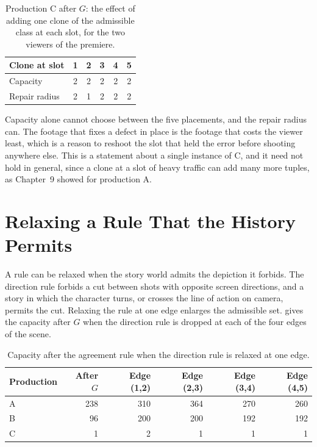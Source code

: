 \documentclass[11pt,twoside,openright]{book}
\theoremstyle{plain}
\theoremstyle{definition}
\theoremstyle{remark}
\begin{document}
\begin{table}[ht]
\centering
\begin{tabular}{@{}lccccc@{}}
\toprule
Clone at slot & 1 & 2 & 3 & 4 & 5\\
\midrule
Capacity & 2 & 2 & 2 & 2 & 2\\
Repair radius & 2 & 1 & 2 & 2 & 2\\
\bottomrule
\end{tabular}
\caption{Production C after $G$: the effect of adding one clone of the admissible class at each slot, for the two viewers of the premiere.}\label{tab:clone}
\end{table}

Capacity alone cannot choose between the five placements, and the repair radius can. The footage that fixes a defect in place is the footage that costs the viewer least, which is a reason to reshoot the slot that held the error before shooting anywhere else. This is a statement about a single instance of C, and it need not hold in general, since a clone at a slot of heavy traffic can add many more tuples, as Chapter~9 showed for production A.

\section{Relaxing a Rule That the History Permits}\label{sec:relax}

A rule can be relaxed when the story world admits the depiction it forbids. The direction rule forbids a cut between shots with opposite screen directions, and a story in which the character turns, or crosses the line of action on camera, permits the cut. Relaxing the rule at one edge enlarges the admissible set.  gives the capacity after $G$ when the direction rule is dropped at each of the four edges of the scene.

\begin{table}[ht]
\centering
\begin{tabular}{@{}lrrrrr@{}}
\toprule
Production & After $G$ & Edge (1,2) & Edge (2,3) & Edge (3,4) & Edge (4,5)\\
\midrule
A & 238 & 310 & 364 & 270 & 260\\
B & 96 & 200 & 200 & 192 & 192\\
C & 1 & 2 & 1 & 1 & 1\\
\bottomrule
\end{tabular}
\caption{Capacity after the agreement rule when the direction rule is relaxed at one edge.}\label{tab:relax}
\end{table}
\end{document}
